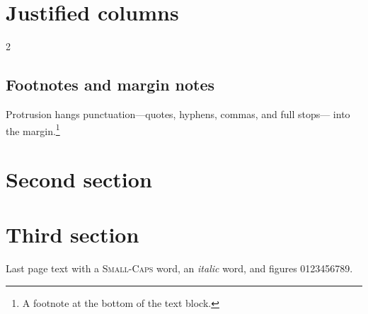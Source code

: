 \documentclass[10pt,twoside]{article}
\begin{document}
\section{Justified columns}
\begin{multicols}{2}
\lipsum[1]
\end{multicols}
\subsection{Footnotes and margin notes}
Protrusion hangs punctuation---quotes, hyphens, commas, and full stops--- into the margin.\footnote{A footnote at the bottom of the text block.}
\begin{RaggedRight}
\lipsum[2]
\end{RaggedRight}
\newpage
\section{Second section}
\lipsum[3-4]
\newpage
\section{Third section}
Last page text with a \textsc{Small-Caps} word, an \textit{italic} word, and figures 0123456789.
\end{document}
